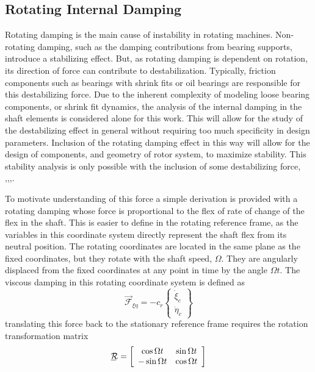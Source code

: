 \subsection{Rotating Internal Damping} \label{Rotating Internal Damping}
Rotating damping is the main cause of instability in rotating machines. Non-rotating damping, such as the damping contributions from bearing supports, introduce a stabilizing effect. But, as rotating damping is dependent on rotation, its direction of force can contribute to destabilization. Typically, friction components such as bearings with shrink fits or oil bearings are responsible for this destabilizing force. Due to the inherent complexity of modeling loose bearing components, or shrink fit dynamics, the analysis of the internal damping in the shaft elements is considered alone for this work. This will allow for the study of the destabilizing effect in general without requiring too much specificity in design parameters. Inclusion of the rotating damping effect in this way will allow for the design of components, and geometry of rotor system, to maximize stability. This stability analysis is only possible with the inclusion of some destabilizing force, \cite{genta2004persistent},\cite{genta2007dynamics},\cite{kandil2005rotor},\cite{zorzi1977finite}.\par 
To motivate understanding of this force a simple derivation is provided with a rotating damping whose force is proportional to the flex of rate of change of the flex in the shaft. This is easier to define in the rotating reference frame, as the variables in this coordinate system directly represent the shaft flex from its neutral position. The rotating coordinates are located in the same plane as the fixed coordinates, but they rotate with the shaft speed, $ \Omega $. They are angularly displaced from the fixed coordinates at any point in time by the angle $ \Omega t $. The viscous damping in this rotating coordinate system is defined as
\begin{equation}\label{eq:LinearViscousDampingRot}
\vec{\mathcal{F}}_{\xi\eta}=-c_r
\left\{\begin{array}{c}
\dot{\xi}_c\\
\dot{\eta}_c
\end{array}\right\}
\end{equation}
translating this force back to the stationary reference frame requires the rotation transformation matrix 
\begin{equation}\label{eq:RotationTransformation2D}
\bunderline{\mathcal{R}}=\left[\begin{array}{cc}
\cos{\Omega t}& \sin{\Omega t}\\
-\sin{\Omega t}& \cos{\Omega t}
\end{array}\right]
\end{equation}
